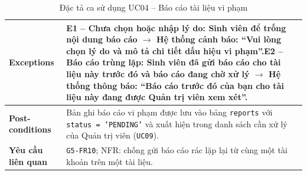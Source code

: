 \begin{table}[H]
\begin{tabularx}{\textwidth}{|p{3.5cm}|X|}
\hline
\textbf{Exceptions} & E1 -- Chưa chọn hoặc nhập lý do: Sinh viên để trống nội dung báo cáo $\rightarrow$ Hệ thống cảnh báo: ``Vui lòng chọn lý do và mô tả chi tiết dấu hiệu vi phạm''.\newline E2 -- Báo cáo trùng lặp: Sinh viên đã gửi báo cáo cho tài liệu này trước đó và báo cáo đang chờ xử lý $\rightarrow$ Hệ thống thông báo: ``Báo cáo trước đó của bạn cho tài liệu này đang được Quản trị viên xem xét''. \\
\hline
\textbf{Post-conditions} & Bản ghi báo cáo vi phạm được lưu vào bảng \texttt{reports} với \texttt{status = 'PENDING'} và xuất hiện trong danh sách cần xử lý của Quản trị viên (\texttt{UC09}). \\
\hline
\textbf{Yêu cầu liên quan} & \texttt{G5-FR10}; NFR: chống gửi báo cáo rác lặp lại từ cùng một tài khoản trên một tài liệu. \\
\hline
\end{tabularx}
\caption{Đặc tả ca sử dụng UC04 -- Báo cáo tài liệu vi phạm}
\label{tab:uc04}
\end{table}


